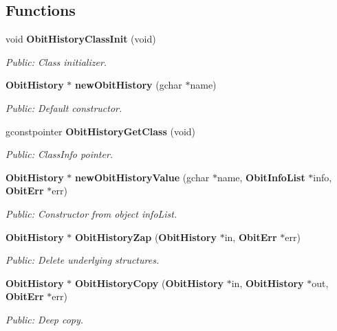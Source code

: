 \subsection*{Functions}
\begin{CompactItemize}
\item 
void {\bf Obit\-History\-Class\-Init} (void)
\begin{CompactList}\small\item\em Public: Class initializer. \item\end{CompactList}\item 
{\bf Obit\-History} $\ast$ {\bf new\-Obit\-History} (gchar $\ast$name)
\begin{CompactList}\small\item\em Public: Default constructor. \item\end{CompactList}\item 
gconstpointer {\bf Obit\-History\-Get\-Class} (void)
\begin{CompactList}\small\item\em Public: Class\-Info pointer. \item\end{CompactList}\item 
{\bf Obit\-History} $\ast$ {\bf new\-Obit\-History\-Value} (gchar $\ast$name, {\bf Obit\-Info\-List} $\ast$info, {\bf Obit\-Err} $\ast$err)
\begin{CompactList}\small\item\em Public: Constructor from object info\-List. \item\end{CompactList}\item 
{\bf Obit\-History} $\ast$ {\bf Obit\-History\-Zap} ({\bf Obit\-History} $\ast$in, {\bf Obit\-Err} $\ast$err)
\begin{CompactList}\small\item\em Public: Delete underlying structures. \item\end{CompactList}\item 
{\bf Obit\-History} $\ast$ {\bf Obit\-History\-Copy} ({\bf Obit\-History} $\ast$in, {\bf Obit\-History} $\ast$out, {\bf Obit\-Err} $\ast$err)
\begin{CompactList}\small\item\em Public: Deep copy. \item\end{CompactList}\item 

\end{CompactItemize}
